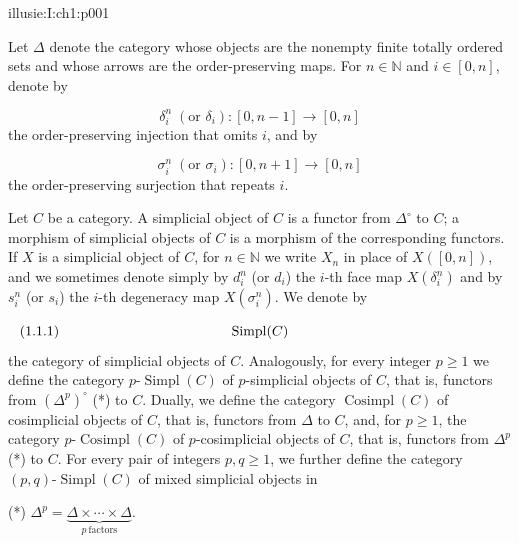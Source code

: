 \IllusieSetPhysicalPageSize{450.6bp}{704bp}
\begin{illusiebodypage}{illusie:I:ch1:p001}
\hypertarget{illusie:I:ch1}{}%
\hypertarget{illusie:I:ch1:s1}{}%
\hypertarget{illusie:I:ch1:s1:1}{}%

\hypertarget{illusie:I:ch1:s1:1:p1}{}%
Let $\Delta$ denote the category whose objects are the nonempty finite totally
ordered sets and whose arrows are the order-preserving maps. For
$n\in\mathbb{N}$ and $i\in[0,n]$, denote by

\hypertarget{illusie:I:ch1:s1:1:d1}{}%
\[
  \delta_i^n\; (\text{or }\delta_i):[0,n-1]\longrightarrow[0,n]
\]
the order-preserving injection that omits $i$, and by

\hypertarget{illusie:I:ch1:s1:1:d2}{}%
\[
  \sigma_i^n\; (\text{or }\sigma_i):[0,n+1]\longrightarrow[0,n]
\]
the order-preserving surjection that repeats $i$.

\hypertarget{illusie:I:ch1:s1:1:p2}{}%
Let $C$ be a category. A simplicial object of $C$ is a functor from
$\Delta^{\circ}$ to $C$; a morphism of simplicial objects of $C$ is a morphism
of the corresponding functors. If $X$ is a simplicial object of $C$, for
$n\in\mathbb{N}$ we write $X_n$ in place of $X([0,n])$, and we sometimes
denote simply by $d_i^n$ (or $d_i$) the $i$-th face map $X(\delta_i^n)$ and by
$s_i^n$ (or $s_i$) the $i$-th degeneracy map $X(\sigma_i^n)$. We denote by

\hypertarget{illusie:I:ch1:s1:1:eq1}{}%
\[
  \makebox[\linewidth][s]{\text{(1.1.1)}\hfill$\operatorname{Simpl}(C)$\hfill\phantom{\text{(1.1.1)}}}
\]
the category of simplicial objects of $C$. Analogously, for every integer
$p\geq1$ we define the category $p\text{-}\operatorname{Simpl}(C)$ of
$p$-simplicial objects of $C$, that is, functors from $(\Delta^p)^{\circ}$ (*)
to $C$. Dually, we define the category $\operatorname{Cosimpl}(C)$ of
cosimplicial objects of $C$, that is, functors from $\Delta$ to $C$, and, for
$p\geq1$, the category $p\text{-}\operatorname{Cosimpl}(C)$ of
$p$-cosimplicial objects of $C$, that is, functors from $\Delta^p$ (*) to $C$.
For every pair of integers $p,q\geq1$, we further define the category
$(p,q)\text{-}\operatorname{Simpl}(C)$ of mixed simplicial objects in

\vfill
{}\hypertarget{illusie:I:ch1:s1:1:n1}{}%
{\fontsize{8}{9.5}\selectfont\noindent
(*) $\displaystyle \Delta^p=\underbrace{\Delta\times\cdots\times\Delta}_{p\ \text{factors}}$.}
\end{illusiebodypage}
